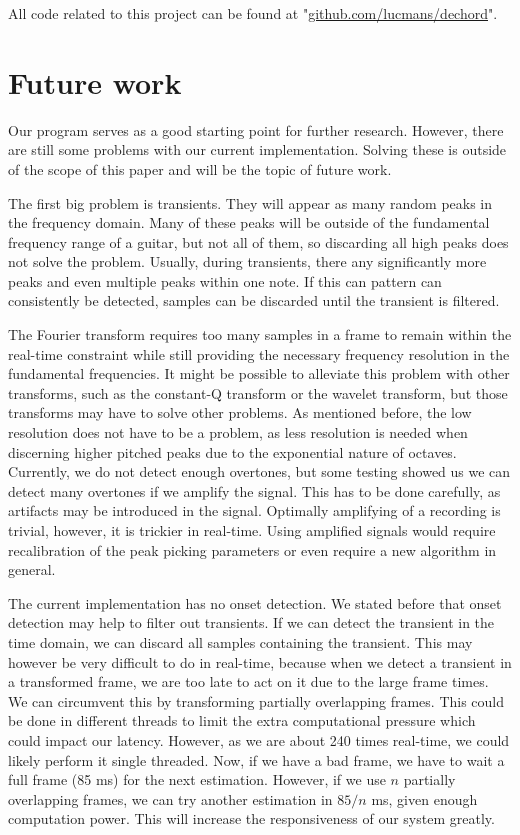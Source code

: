 \documentclass[10pt,twocolumn]{article}
\begin{document}
All code related to this project can be found at "\url{github.com/lucmans/dechord}".


\section{Future work}  \label{sec:future}
Our program serves as a good starting point for further research. However, there are still some problems with our current implementation. Solving these is outside of the scope of this paper and will be the topic of future work.

The first big problem is transients. They will appear as many random peaks in the frequency domain. Many of these peaks will be outside of the fundamental frequency range of a guitar, but not all of them, so discarding all high peaks does not solve the problem. Usually, during transients, there any significantly more peaks and even multiple peaks within one note. If this can pattern can consistently be detected, samples can be discarded until the transient is filtered.

The Fourier transform requires too many samples in a frame to remain within the real-time constraint while still providing the necessary frequency resolution in the fundamental frequencies. It might be possible to alleviate this problem with other transforms, such as the constant-Q transform or the wavelet transform, but those transforms may have to solve other problems. As mentioned before, the low resolution does not have to be a problem, as less resolution is needed when discerning higher pitched peaks due to the exponential nature of octaves. Currently, we do not detect enough overtones, but some testing showed us we can detect many overtones if we amplify the signal. This has to be done carefully, as artifacts may be introduced in the signal. Optimally amplifying of a recording is trivial, however, it is trickier in real-time. Using amplified signals would require recalibration of the peak picking parameters or even require a new algorithm in general.

The current implementation has no onset detection. We stated before that onset detection may help to filter out transients. If we can detect the transient in the time domain, we can discard all samples containing the transient. This may however be very difficult to do in real-time, because when we detect a transient in a transformed frame, we are too late to act on it due to the large frame times. We can circumvent this by transforming partially overlapping frames. This could be done in different threads to limit the extra computational pressure which could impact our latency. However, as we are about 240 times real-time, we could likely perform it single threaded. Now, if we have a bad frame, we have to wait a full frame (85 ms) for the next estimation. However, if we use $n$ partially overlapping frames, we can try another estimation in $85/n$ ms, given enough computation power. This will increase the responsiveness of our system greatly.
\end{document}
